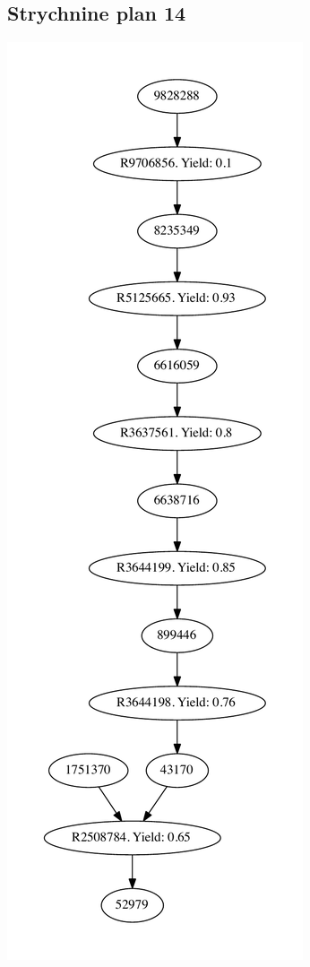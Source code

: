 \documentclass[a4paper,10pt,titlepage]{paper}
\begin{document}
\subsection{Strychnine plan 14}
\centering
\includegraphics[scale=0.4]{Synteseplaner/Strychnine/plan14.pdf}
\label{Appendix::Strychnine14}
\end{document}
